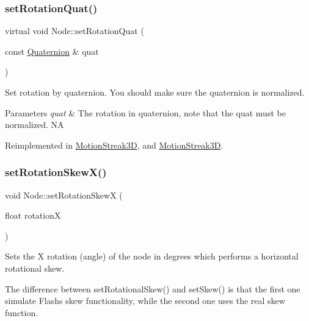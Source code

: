 \subsubsection{\texorpdfstring{set\+Rotation\+Quat()}{setRotationQuat()}\hspace{0.1cm}{\footnotesize\ttfamily [2/2]}}
{\footnotesize\ttfamily virtual void Node\+::set\+Rotation\+Quat (\begin{DoxyParamCaption}\item[{const \hyperlink{classQuaternion}{Quaternion} \&}]{quat }\end{DoxyParamCaption})\hspace{0.3cm}{\ttfamily [virtual]}}

Set rotation by quaternion. You should make sure the quaternion is normalized.


\begin{DoxyParams}{Parameters}
{\em quat} & The rotation in quaternion, note that the quat must be normalized.  NA \\
\hline
\end{DoxyParams}


Reimplemented in \hyperlink{classMotionStreak3D_a7e9e94bce7204f28d6b8dff196d163d9}{Motion\+Streak3D}, and \hyperlink{classMotionStreak3D_ab3b762bdfe6cbda5cda6b69ca8d31845}{Motion\+Streak3D}.

\mbox{\label{classNode_a66a533225994dbfe125c3421df4cbb38}} 
\subsubsection{\texorpdfstring{set\+Rotation\+Skew\+X()}{setRotationSkewX()}\hspace{0.1cm}{\footnotesize\ttfamily [1/2]}}
{\footnotesize\ttfamily void Node\+::set\+Rotation\+SkewX (\begin{DoxyParamCaption}\item[{float}]{rotationX }\end{DoxyParamCaption})\hspace{0.3cm}{\ttfamily [virtual]}}

Sets the X rotation (angle) of the node in degrees which performs a horizontal rotational skew.

The difference between {\ttfamily set\+Rotational\+Skew()} and {\ttfamily set\+Skew()} is that the first one simulate Flash\textquotesingle{}s skew functionality, while the second one uses the real skew function.

